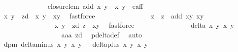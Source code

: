 \begin{isabellebody}
\isanewline
\ \ \ \ \ \ \ \ \ \ \ \ \isamarkupfalse%
\ closure{\isacharunderscore}lem{\isacharcolon}\ {\isachardoublequoteopen}add\ {\isacharparenleft}x{\isacharcomma}\ y{\isacharparenright}\ {\isacharparenleft}{\isasymtau}\ {\isacharparenleft}x{\isacharprime}{\isacharcomma}\ y{\isacharprime}{\isacharparenright}{\isacharparenright}\ {\isasymin}\ e{\isacharunderscore}aff{\isachardoublequoteclose}\isanewline
\ \ \ \ \ \ \ \ \ \ \ \ \isamarkupfalse%
\ {\isacharminus}\isanewline
\ \ \ \ \ \ \ \ \ \ \ \ \ \ \isamarkupfalse%
\ x{}\ y{}\ \ z{}{\isacharunderscore}d{\isacharcolon}\ {\isachardoublequoteopen}{\isasymtau}\ {\isacharparenleft}x{\isacharprime}{\isacharcomma}\ y{\isacharprime}{\isacharparenright}\ {\isacharequal}\ {\isacharparenleft}x{}{\isacharcomma}y{}{\isacharparenright}{\isachardoublequoteclose}\ \isamarkupfalse%
\ fastforce\isanewline
\ \ \ \ \ \ \ \ \ \ \ \ \ \ \isamarkupfalse%
\ z{}\ \ {\isachardoublequoteopen}z{}\ {\isacharequal}\ add\ {\isacharparenleft}x{\isacharcomma}y{\isacharparenright}\ {\isacharparenleft}x{}{\isacharcomma}y{}{\isacharparenright}{\isachardoublequoteclose}\isanewline
\ \ \ \ \ \ \ \ \ \ \ \ \ \ \isamarkupfalse%
\ x{}\ y{}\ \ z{}{\isacharunderscore}d{\isacharcolon}\ {\isachardoublequoteopen}z{}\ {\isacharequal}\ {\isacharparenleft}x{}{\isacharcomma}y{}{\isacharparenright}{\isachardoublequoteclose}\ \isamarkupfalse%
\ fastforce\isanewline
\ \ \ \ \ \ \ \ \ \ \ \ \ \ \isamarkupfalse%
\ {\isachardoublequoteopen}delta\ x\ y\ x{}\ y{}\ {\isasymnoteq}\ {}{\isachardoublequoteclose}\isanewline
\ \ \ \ \ \ \ \ \ \ \ \ \ \ \ \ \isamarkupfalse%
\ aaa\ z{}{\isacharunderscore}d\ \isamarkupfalse%
\ p{\isacharunderscore}delta{\isacharunderscore}def\ \isamarkupfalse%
\ auto\isanewline
\ \ \ \ \ \ \ \ \ \ \ \ \ \ \isamarkupfalse%
\ \isamarkupfalse%
\ dpm{\isacharcolon}\ {\isachardoublequoteopen}delta{\isacharunderscore}minus\ x\ y\ x{}\ y{}\ {\isasymnoteq}\ {}{\isachardoublequoteclose}\ {\isachardoublequoteopen}delta{\isacharunderscore}plus\ x\ y\ x{}\ y{}\ {\isasymnoteq}\ {}{\isachardoublequoteclose}\isanewline

\end{isabellebody}
